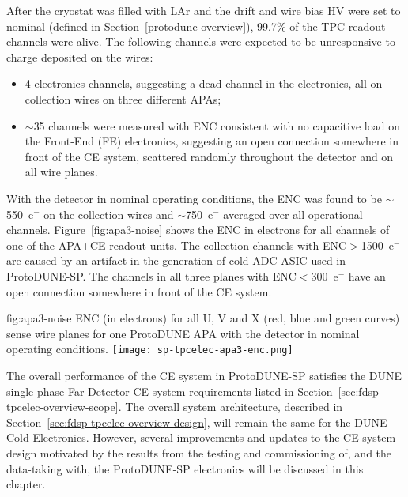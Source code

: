 After the cryostat was filled with LAr and the drift and wire bias HV were set to nominal (defined in Section~\ref{protodune-overview}), 99.7\% of the TPC readout channels were alive. The following channels were expected to be unresponsive to charge deposited on the wires:
\begin{itemize}
\item 4 electronics channels, suggesting a dead channel in the electronics, all on collection wires on three different APAs;
\item $\sim$35 channels were measured with ENC consistent with no capacitive load on the Front-End (FE) electronics, suggesting an open connection somewhere in front of the CE system, scattered randomly throughout the detector and on all wire planes.
\end{itemize}
With the detector in nominal operating conditions, the ENC was found to be $\sim$550~e$^-$ on the collection wires and $\sim$750~e$^-$ averaged over all operational channels. Figure~\ref{fig:apa3-noise} shows the ENC in electrons for all channels of one of the APA+CE readout units. The collection channels with ENC$>$1500~e$^-$ are caused by an artifact in the generation of cold ADC ASIC used in ProtoDUNE-SP. The channels in all three planes with ENC$<$300~e$^-$ have an open connection somewhere in front of the CE system.

\begin{dunefigure}
{fig:apa3-noise}
{ENC (in electrons) for all U, V and X (red, blue and green curves) sense wire planes for one ProtoDUNE APA with the detector in nominal operating conditions.}
\texttt{[image: sp-tpcelec-apa3-enc.png]}
\end{dunefigure}

The overall performance of the CE system in ProtoDUNE-SP satisfies the DUNE single phase Far Detector CE system requirements listed in Section~\ref{sec:fdsp-tpcelec-overview-scope}. The overall system architecture, described in Section~\ref{sec:fdsp-tpcelec-overview-design}, will remain the same for the DUNE Cold Electronics. However, several improvements and updates to the CE system design motivated by the results from the testing and commissioning of, and the data-taking with, the ProtoDUNE-SP electronics will be discussed in this chapter.

